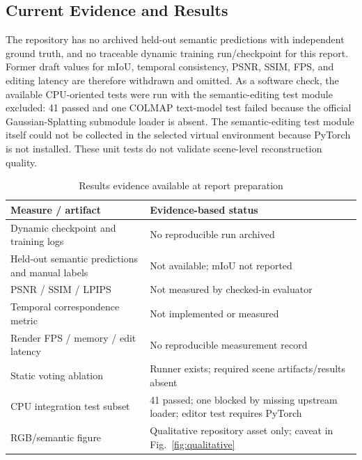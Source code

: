\documentclass[conference]{IEEEtran}
\begin{document}
\subsection{Current Evidence and Results}
The repository has no archived held-out semantic predictions with independent ground truth, and no traceable dynamic training run/checkpoint for this report. Former draft values for mIoU, temporal consistency, PSNR, SSIM, FPS, and editing latency are therefore withdrawn and omitted. As a software check, the available CPU-oriented tests were run with the semantic-editing test module excluded: 41 passed and one COLMAP text-model test failed because the official Gaussian-Splatting submodule loader is absent. The semantic-editing test module itself could not be collected in the selected virtual environment because PyTorch is not installed. These unit tests do not validate scene-level reconstruction quality.

\begin{table}[t]
\caption{Results evidence available at report preparation}
\label{tab:results}
\centering
\footnotesize
\begin{tabular}{p{}p{}}
\toprule
Measure / artifact & Evidence-based status \\
\midrule
Dynamic checkpoint and training logs & No reproducible run archived \\
Held-out semantic predictions and manual labels & Not available; mIoU not reported \\
PSNR / SSIM / LPIPS & Not measured by checked-in evaluator \\
Temporal correspondence metric & Not implemented or measured \\
Render FPS / memory / edit latency & No reproducible measurement record \\
Static voting ablation & Runner exists; required scene artifacts/results absent \\
CPU integration test subset & 41 passed; one blocked by missing upstream loader; editor test requires PyTorch \\
RGB/semantic figure & Qualitative repository asset only; caveat in Fig.~\ref{fig:qualitative} \\
\bottomrule
\end{tabular}
\end{table}
\end{document}
